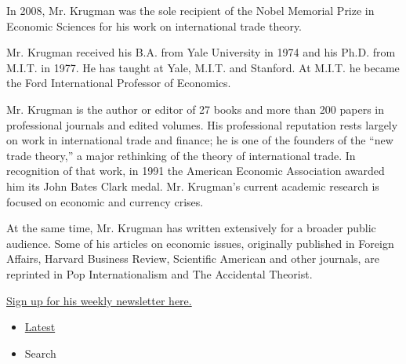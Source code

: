 In 2008, Mr. Krugman was the sole recipient of the Nobel Memorial Prize
in Economic Sciences for his work on international trade theory.

Mr. Krugman received his B.A. from Yale University in 1974 and his Ph.D.
from M.I.T. in 1977. He has taught at Yale, M.I.T. and Stanford. At
M.I.T. he became the Ford International Professor of Economics.

Mr. Krugman is the author or editor of 27 books and more than 200 papers
in professional journals and edited volumes. His professional reputation
rests largely on work in international trade and finance; he is one of
the founders of the ``new trade theory,'' a major rethinking of the
theory of international trade. In recognition of that work, in 1991 the
American Economic Association awarded him its John Bates Clark medal.
Mr. Krugman's current academic research is focused on economic and
currency crises.

At the same time, Mr. Krugman has written extensively for a broader
public audience. Some of his articles on economic issues, originally
published in Foreign Affairs, Harvard Business Review, Scientific
American and other journals, are reprinted in Pop Internationalism and
The Accidental Theorist.

\href{https://www.nytimes.com/newsletters/paul-krugman}{Sign up for his
weekly newsletter here.}

\begin{itemize}
\tightlist
\item
  \protect\hyperlink{stream-panel}{Latest}
\item
  Search
\end{itemize}

